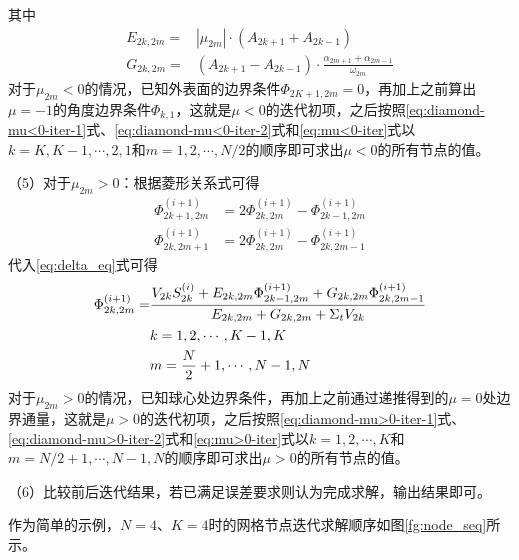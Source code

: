 \documentclass[a4paper,10.5pt]{article}
\begin{document}
其中
\begin{align*}
E_{2k,2m}=&\left|\mu_{2m}\right|\cdot(A_{2k+1}+A_{2k-1})\\
G_{2k,2m}=&(A_{2k+1}-A_{2k-1})\cdot\frac{\alpha_{2m+1}+\alpha_{2m-1}}{\omega_{2m}}
\end{align*}
对于$\mu_{2m}<0$的情况，已知外表面的边界条件$\Phi_{2K+1,2m}=0$，再加上之前算出$\mu=-1$的角度边界条件$\Phi_{k,1}$，这就是$\mu<0$的迭代初项，之后按照\eqref{eq:diamond-mu<0-iter-1}式、\eqref{eq:diamond-mu<0-iter-2}式和\eqref{eq:mu<0-iter}式以$k=K,K-1,\cdots,2,1$和$m=1,2,\cdots,N/2$的顺序即可求出$\mu<0$的所有节点的值。\par
（5）对于$\mu_{2m}>0$：根据菱形关系式可得
\begin{align}
\Phi_{2k+1,2m}^{(i+1)}&=2\Phi_{2k,2m}^{(i+1)}-\Phi_{2k-1,2m}^{(i+1)}\label{eq:diamond-mu>0-iter-1}\\
\Phi_{2k,2m+1}^{(i+1)}&=2\Phi_{2k,2m}^{(i+1)}-\Phi_{2k,2m-1}^{(i+1)}\label{eq:diamond-mu>0-iter-2}
\end{align}
代入\eqref{eq:delta_eq}式可得
\begin{align}
\Phi_{2k,2m}^{(i+1)}=&\frac{V_{2k}S_{2k}^{(i)}+E_{2k,2m}\Phi_{2k-1,2m}^{(i+1)}+G_{2k,2m}\Phi_{2k,2m-1}^{(i+1)}}{E_{2k,2m}+G_{2k,2m}+\Sigma_{t}V_{2k}}\label{eq:mu>0-iter}\\
&k=1,2,\cdots,K-1,K\notag\\
&m=\frac{N}{2}+1,\cdots,N-1,N\notag
\end{align}
对于$\mu_{2m}>0$的情况，已知球心处边界条件，再加上之前通过递推得到的$\mu=0$处边界通量，这就是$\mu>0$的迭代初项，之后按照\eqref{eq:diamond-mu>0-iter-1}式、\eqref{eq:diamond-mu>0-iter-2}式和\eqref{eq:mu>0-iter}式以$k=1,2,\cdots,K$和$m=N/2+1,\cdots,N-1,N$的顺序即可求出$\mu>0$的所有节点的值。\par
（6）比较前后迭代结果，若已满足误差要求则认为完成求解，输出结果即可。\par
\vspace{0.4cm}
作为简单的示例，$N=4$、$K=4$时的网格节点迭代求解顺序如图\ref{fg:node_seq}所示。
\end{document}

